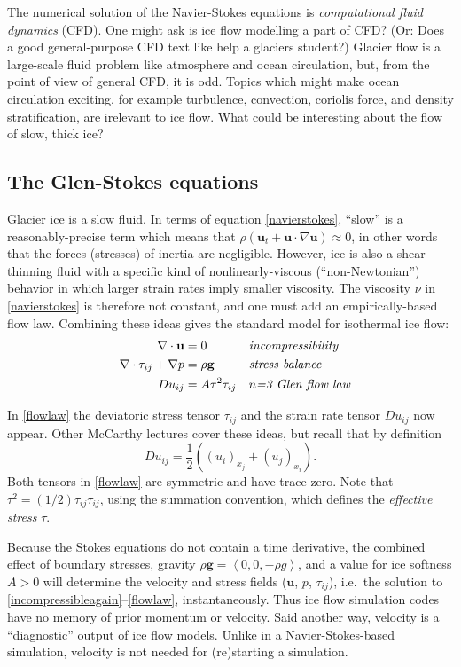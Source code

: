 \documentclass[letterpaper,final,12pt,reqno]{amsart}
\newcommand{\bu}{\mathbf{u}}
\begin{document}
The numerical solution of the Navier-Stokes equations is \emph{computational fluid dynamics} (CFD).  One might ask is ice flow modelling a part of CFD?  (Or: Does a good general-purpose CFD text like \cite{Wesseling} help a glaciers student?)  Glacier flow is a large-scale fluid problem like atmosphere and ocean circulation, but, from the point of view of general CFD, it is odd.   Topics which might make ocean circulation exciting, for example turbulence, convection, coriolis force, and density stratification, are irelevant to ice flow.  What could be interesting about the flow of slow, thick ice?

\subsection*{The Glen-Stokes equations}  Glacier ice is a slow fluid.  In terms of equation \eqref{navierstokes}, ``slow'' is a reasonably-precise term which means that $\rho \left(\mathbf{u}_t + \mathbf{u}\cdot\nabla \mathbf{u}\right) \approx 0$, in other words that the forces (stresses) of inertia are negligible.  However, ice is also a shear-thinning fluid with a specific kind of nonlinearly-viscous (``non-Newtonian'') behavior in which larger strain rates imply smaller viscosity.  The viscosity $\nu$ in \eqref{navierstokes} is therefore not constant, and one must add an empirically-based flow law.  Combining these ideas gives the standard model for isothermal ice flow:
\begin{align}
\nabla \cdot \mathbf{u} &= 0 &&\text{\emph{incompressibility}} \label{incompressibleagain} \\
- \nabla \cdot \tau_{ij} + \nabla p &= \rho \mathbf{g} &&\text{\emph{stress balance}} \label{forcebalance} \\
Du_{ij} &= A \tau^2 \tau_{ij} &&\text{\emph{$n$=3 Glen flow law}} \label{flowlaw}
\end{align}

In \eqref{flowlaw} the deviatoric stress tensor $\tau_{ij}$ and the strain rate tensor $Du_{ij}$ now appear.  Other McCarthy lectures cover these ideas, but recall that by definition
    $$Du_{ij} = \frac{1}{2} \left((u_i)_{x_j}+(u_j)_{x_i}\right).$$
Both tensors in \eqref{flowlaw} are symmetric and have trace zero.  Note that $\tau^2 = (1/2) \tau_{ij} \tau_{ij}$, using the summation convention, which defines the \emph{effective stress} $\tau$.

Because the Stokes equations do not contain a time derivative, the combined effect of boundary stresses, gravity $\rho \mathbf{g} = \left<0,0,-\rho g\right>$, and a value for ice softness $A>0$ will determine the velocity and stress fields ($\bu$, $p$, $\tau_{ij}$), i.e.~the solution to \eqref{incompressibleagain}--\eqref{flowlaw}, instantaneously.  Thus ice flow simulation codes have no memory of prior momentum or velocity.  Said another way, velocity is a ``diagnostic'' output of ice flow models.  Unlike in a Navier-Stokes-based simulation, velocity is not needed for (re)starting a simulation.
\end{document}
